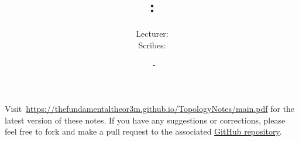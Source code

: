 \documentclass[a4paper, 12pt, openany, oneside]{book}
\title{\vspace{-2em}\COURSENUMBER: \COURSENAME}
\author{Lecturer: \LECTURER \\ Scribes: \SCRIBE}
\date{\UNIVERSITY\ - \TERM}
\begin{document}
\setlength{\abovedisplayskip}{7.5pt}  %
\setlength{\belowdisplayskip}{7.5pt}  %
\setlength{\abovedisplayshortskip}{2pt}
\setlength{\belowdisplayshortskip}{2pt}

\maketitle
\thispagestyle{empty}

\tableofcontents
\thispagestyle{empty}

\newpage

\nocite{*}






\newpage




\printbibliography[prenote=mybibnote]
\thispagestyle{empty}

Visit~\url{https://thefundamentaltheor3m.github.io/TopologyNotes/main.pdf} for the latest version of these notes. If you have any suggestions or corrections, please feel free to fork and make a pull request to the associated \href{https://github.com/thefundamentaltheor3m/TopologyNotes}{GitHub repository}.
\end{document}
